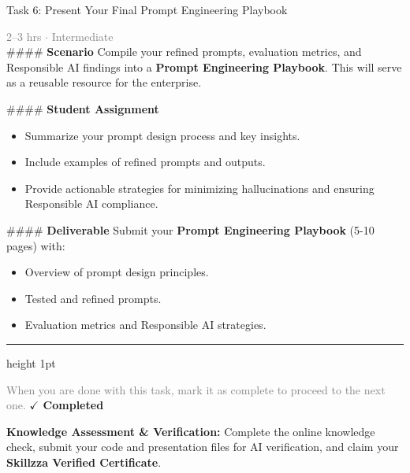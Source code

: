 \documentclass[10pt,a4paper]{article}
\begin{document}
\begin{taskbox}{Task 6: Present Your Final Prompt Engineering Playbook}

    {\small \textcolor{gray}{2--3 hrs $\cdot$ Intermediate}}\\[12pt]

    \#\#\#\# \textbf{Scenario}
Compile your refined prompts, evaluation metrics, and Responsible AI findings into a \textbf{Prompt Engineering Playbook}. This will serve as a reusable resource for the enterprise.

\#\#\#\# \textbf{Student Assignment}
\begin{itemize}
    \item Summarize your prompt design process and key insights.
    \item Include examples of refined prompts and outputs.
    \item Provide actionable strategies for minimizing hallucinations and ensuring Responsible AI compliance.
\end{itemize}

\#\#\#\# \textbf{Deliverable}
Submit your \textbf{Prompt Engineering Playbook} (5-10 pages) with:
\begin{itemize}
    \item Overview of prompt design principles.
    \item Tested and refined prompts.
    \item Evaluation metrics and Responsible AI strategies.\par
\end{itemize}

    \vspace{16pt}

    \textcolor{cardBorder}{\hrule height 1pt}\vspace{8pt}

    \small \textcolor{gray}{When you are done with this task, mark it as complete to proceed to the next one.} \hfill \textbf{\textcolor{brandDark}{$\checkmark$ Completed}}

\end{taskbox}

\begin{completionbox}
    \textbf{Knowledge Assessment \& Verification:} Complete the online knowledge check, submit your code and presentation files for AI verification, and claim your \textbf{Skillzza Verified Certificate}.
\end{completionbox}

\newpage
\end{document}
